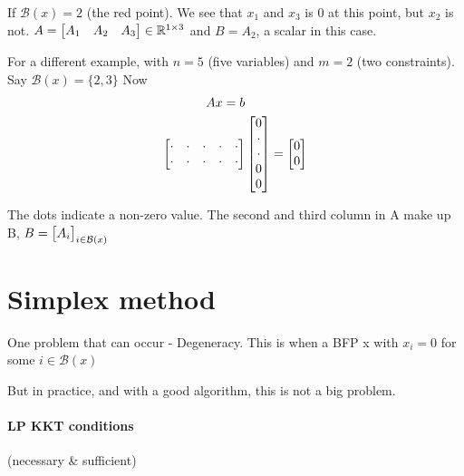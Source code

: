 \documentclass{article}
\begin{document}
If $\mathcal{B}(x) = 2$ (the red point). We see that $x_1$ and $x_3$ is 0 at this point, but $x_2$ is not.
$A = \begin{bmatrix} A_1 & A_2 & A_3 \end{bmatrix}\in \mathbb{R}^{1\times 3}$ and $B = A_2$, a scalar in this case.

\medskip For a different example, with $n = 5$ (five variables) and $m = 2$ (two constraints). Say $\mathcal{B}(x) = \{2, 3\}$
Now
\begin{align*}
  Ax = b   &                               \\
  \begin{bmatrix} \cdot & \cdot & \cdot & \cdot & \cdot \\ \cdot & \cdot & \cdot & \cdot & \cdot \end{bmatrix}& \begin{bmatrix} 0 \\ \cdot \\ \cdot \\ 0 \\ 0 \end{bmatrix} = \begin{bmatrix} 0 \\ 0 \end{bmatrix}
\end{align*}

The dots indicate a non-zero value. The second and third column in A make up B, $B = \begin{bmatrix} A_i \end{bmatrix}_{i\in \mathcal{B}(x)}$

\section{Simplex method}



One problem that can occur - Degeneracy. This is when a BFP x with $x_i = 0$ for some $i\in \mathcal{B}(x)$

But in practice, and with a good algorithm, this is not a big problem.
\paragraph{LP KKT conditions} (necessary \& sufficient)
\end{document}

